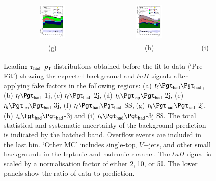 \begin{figure}[H]
\begin{tabular}{@{}ccc@{}}
\includegraphics[page=1,width=0.28\textwidth]{figures/pt/tuH_reg2mtau1b3jos_log_.pdf}&
\includegraphics[page=1,width=0.28\textwidth]{figures/pt/tuH_reg2mtau1b3jss_log_.pdf}\\
(g) & (h) & (i)\\
\end{tabular}
\caption{Leading $\tau_\text{had}$ $p_{\text{T}}$  distributions obtained before the fit to data (`Pre-Fit') showing 
  the expected background and $tuH$ signals after applying fake factors in the following regions: (a) $t_{\ell}\thadhad$,
 (b) $t_{\ell}\tauhad$-1j,  (c) $t_{\ell}\tauhad$-2j, (d) $t_h\tlhad$-2j, (e) $t_h\tlhad$-3j, (f) $t_{\ell}\thadhad$-SS, (g) $t_h\thadhad$-2j, (h) $t_h\thadhad$-3j and (i) $t_h\thadhad$-3j SS.
 The total statistical and systematic uncertainty of the background prediction is indicated by the hatched band.
 Overflow events are included in the last bin. `Other MC' includes single-top, $V$+jets, and other small backgrounds in the leptonic and hadronic channel. The $tuH$ signal is scaled by a
 normalisation factor of either 2, 10, or 50.   
The lower panels show the ratio of data to prediction.}
\label{fig:taupt_prefit}
\end{figure}





